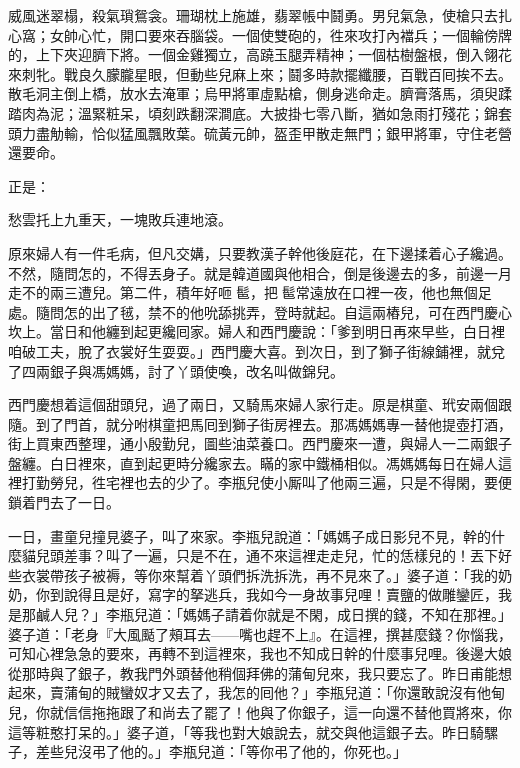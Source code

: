 \begin{myquote}
威風迷翠榻，殺氣瑣鴛衾。珊瑚枕上施雄，翡翠帳中鬪勇。男兒氣急，使槍只去扎心窩；女帥心忙，開口要來吞腦袋。一個使雙砲的，徃來攻打內襠兵；一個輪傍牌的，上下夾迎臍下將。一個金雞獨立，高蹺玉腿弄精神；一個枯樹盤根，倒入翎花來刺牝。戰良久朦朧星眼，但動些兒麻上來；鬪多時款擺纖腰，百戰百囘挨不去。散毛洞主倒上橋，放水去淹軍；烏甲將軍虛點槍，側身逃命走。臍膏落馬，須臾蹂踏肉為泥；溫緊粧呆，頃刻跌翻深澗底。大披掛七零八斷，猶如急雨打殘花；錦套頭力盡觔輸，恰似猛風飄敗葉。硫黃元帥，盔歪甲散走無門；銀甲將軍，守住老營還要命。

正是：

愁雲托上九重天，一塊敗兵連地滾。
\end{myquote}

原來婦人有一件毛病，{}但凡交媾，只要教漢子幹他後庭花，在下邊揉着心子纔過。不然，隨問怎的，不得丟身子。就是韓道國與他相合，倒是後邊去的多，前邊一月走不的兩三遭兒。第二件，積年好咂𩫻䯲，把𩫻䯲常遠放在口裡一夜，他也無個足處。隨問怎的出了毧，禁不的他吮舔挑弄，登時就起。自這兩樁兒，可在西門慶心坎上。當日和他纏到起更纔囘家。婦人和西門慶說：「爹到明日再來早些，白日裡咱破工夫，脫了衣裳好生耍耍。」西門慶大喜。到次日，到了獅子街線鋪裡，就兌了四兩銀子與馮媽媽，討了丫頭使喚，改名叫做錦兒。

西門慶想着這個甜頭兒，過了兩日，又騎馬來婦人家行走。原是棋童、玳安兩個跟隨。到了門首，就分咐棋童把馬囘到獅子街房裡去。那馮媽媽專一替他提壺打酒，街上買東西整理，通小殷勤兒，圖些油菜養口。西門慶來一遭，與婦人一二兩銀子盤纏。白日裡來，直到起更時分纔家去。瞞的家中鐵桶相似。馮媽媽每日在婦人這裡打勤勞兒，徃宅裡也去的少了。李瓶兒使小厮叫了他兩三遍，只是不得閑，要便鎖着門去了一日。

一日，畫童兒撞見婆子，叫了來家。李瓶兒說道：「媽媽子成日影兒不見，幹的什麼貓兒頭差事？叫了一遍，只是不在，通不來這裡走走兒，忙的恁樣兒的！丟下好些衣裳帶孩子被褥，等你來幫着丫頭們拆洗拆洗，再不見來了。」婆子道：「我的奶奶，你到說得且是好，寫字的拏逃兵，我如今一身故事兒哩！賣鹽的做雕鑾匠，我是那鹹人兒？」{}李瓶兒道：「媽媽子請着你就是不閑，成日撰的錢，不知在那裡。」婆子道：「老身『大風颳了頰耳去——嘴也趕不上』。在這裡，撰甚麼錢？你惱我，可知心裡急急的要來，再轉不到這裡來，我也不知成日幹的什麼事兒哩。後邊大娘從那時與了銀子，教我門外頭替他稍個拜佛的蒲甸兒來，我只要忘了。昨日甫能想起來，賣蒲甸的賊蠻奴才又去了，我怎的囘他？」李瓶兒道：「你還敢說沒有他甸兒，你就信信拖拖跟了和尚去了罷了！他與了你銀子，這一向還不替他買將來，你這等粧憨打呆的。」婆子道，「等我也對大娘說去，就交與他這銀子去。昨日騎騾子，差些兒沒弔了他的。」李瓶兒道：「等你弔了他的，你死也。」

